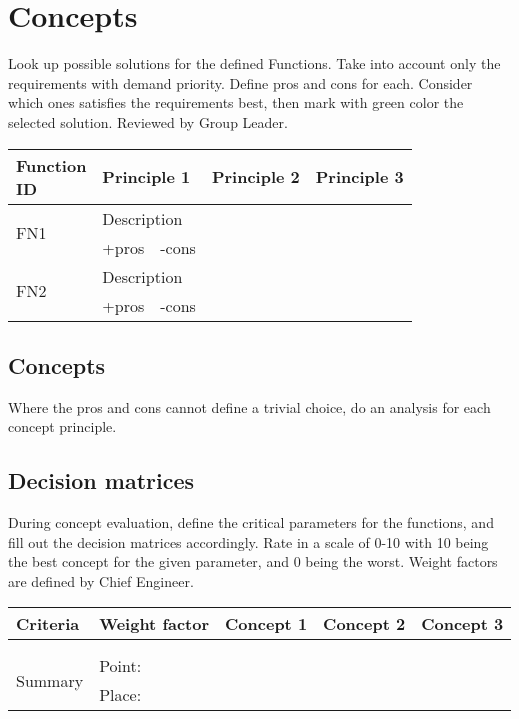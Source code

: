 \documentclass[12pt,a4paper]{article}
\begin{document}
\section*{Concepts}
	Look up possible solutions for the defined Functions. Take into account only the requirements with demand priority. Define pros and cons for each. Consider which ones satisfies the requirements best, then mark with green color the selected solution. Reviewed by Group Leader.
	\begin{table}[H]
		\centering
		\begin{tabular}{|l|l|l|l|l|l|l|}
			\hline
			\makecell[l]{\textbf{Function}\\\textbf{ID}}& \multicolumn{2}{l|}{\textbf{Principle 1}} &  \multicolumn{2}{l|}{\textbf{Principle 2}} &\multicolumn{2}{l|}{\textbf{Principle 3}}     \\
			\hline
			\multirow{2}{*}{FN1}&  \multicolumn{2}{l|}{Description}  &  &  &  &  \\
			\cline{2-7}
			& +pros & -cons &  &  &  &  \\
			\hline
			\multirow{2}{*}{FN2}&  \multicolumn{2}{l|}{Description}  &  &  &  &  \\
			\cline{2-7}
			& +pros & -cons &  &  &  &  \\
			\hline
		\end{tabular}		
	\end{table}
	
	\subsection*{Concepts}
		Where the pros and cons cannot define a trivial choice, do an analysis for each concept principle.
	\subsection*{Decision matrices}
		During concept evaluation, define the critical parameters for the functions, and fill out the decision matrices accordingly. Rate in a scale of 0-10 with 10 being the best concept for the given parameter, and 0 being the worst. Weight factors are defined by Chief Engineer.
		
		\begin{table}[H]
			\centering
			\begin{tabular}{|l|l|l|l|l|}
				\hline
				\textbf{Criteria}& \textbf{Weight factor} & \textbf{Concept 1} & \textbf{Concept 2} & \textbf{Concept 3} \\
				\hline
				&  &  &  & \\
				\hline
				&  &  &  & \\
				\hline
				\multirow{2}{*}{Summary}& Point: &  &  &\\
				\cline{2-5}
				& Place: &  &  &  \\
				\hline
			\end{tabular}
		\end{table}
		
\end{document}
